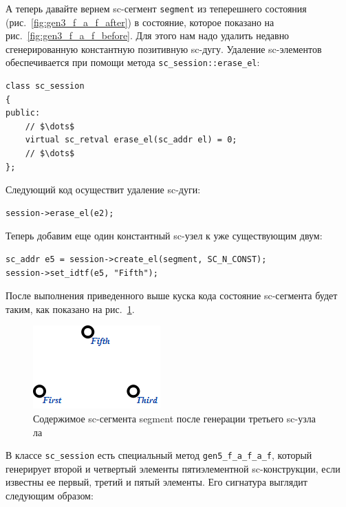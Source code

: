 А теперь давайте вернем sc-сегмент \lstinline|segment| из теперешнего
состояния (рис.~\ref{fig:gen3_f_a_f_after}) в состояние, которое
показано на рис.~\ref{fig:gen3_f_a_f_before}. Для этого нам надо
удалить недавно сгенерированную константную позитивную
sc-дугу. Удаление sc-элементов обеспечивается при помощи метода
\lstinline|sc_session::erase_el|:

\begin{lstlisting}[texcl]
class sc_session
{
public:
    // $\dots$
    virtual sc_retval erase_el(sc_addr el) = 0;
    // $\dots$
};
\end{lstlisting}

Следующий код осуществит удаление sc-дуги:

\begin{lstlisting}[texcl]
session->erase_el(e2);
\end{lstlisting}

Теперь добавим еще один константный sc-узел к уже существующим двум:

\begin{lstlisting}[texcl]
sc_addr e5 = session->create_el(segment, SC_N_CONST);
session->set_idtf(e5, "Fifth");
\end{lstlisting}

После выполнения приведенного выше куска кода состояние sc-сегмента
будет таким, как показано на рис.~\ref{fig:gen5_f_a_f_a_f_before}.

\begin{figure}[h!]
  \centering
  \includegraphics{images/4/gen/gen5_f_a_f_a_f_before}
  \caption{Содержимое sc-сегмента segment после генерации третьего sc-узла ла}
  \label{fig:gen5_f_a_f_a_f_before}
\end{figure}

В классе \lstinline|sc_session| есть специальный метод
\lstinline|gen5_f_a_f_a_f|, который генерирует второй и четвертый
элементы пятиэлементной sc-конструкции, если известны ее первый,
третий и пятый элементы. Его сигнатура выглядит следующим образом:

